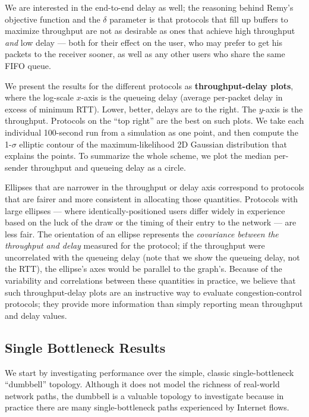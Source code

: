 We are interested in the end-to-end delay as well; the reasoning
behind Remy's objective function and the $\delta$ parameter is that
protocols that fill up buffers to maximize throughput are not as
desirable as ones that achieve high throughput \emph{and} low delay
--- both for their effect on the user, who may prefer to get his
packets to the receiver sooner, as well as any other users who share
the same FIFO queue.

We present the results for the different protocols as {\bf
  throughput-delay plots}, where the log-scale $x$-axis is the
queueing delay (average per-packet delay in excess of minimum
RTT). Lower, better, delays are to the right.  The $y$-axis is the
throughput. Protocols on the ``top right'' are the best on such
plots. We take each individual 100-second run from a simulation as one
point, and then compute the 1-$\sigma$ elliptic contour
of the maximum-likelihood 2D Gaussian distribution that explains the
points. To summarize the whole scheme, we plot the median per-sender
throughput and queueing delay as a circle.

Ellipses that are narrower in the throughput or delay axis correspond
to protocols that are fairer and more consistent in allocating those
quantities. Protocols with large ellipses --- where
identically-positioned users differ widely in experience based on the
luck of the draw or the timing of their entry to the network --- are
less fair. The orientation of an ellipse represents the {\em
  covariance between the throughput and delay} measured for the
protocol; if the throughput were uncorrelated with the queueing delay
(note that we show the queueing delay, not the RTT), the ellipse's
axes would be parallel to the graph's.
Because of the variability and correlations between these quantities
in practice, we believe that such throughput-delay plots are an
instructive way to evaluate congestion-control protocols; they provide
more information than simply reporting mean throughput and delay values.

\subsection{Single Bottleneck Results}

We start by investigating performance over the simple, classic
single-bottleneck ``dumbbell'' topology.  Although it does not model
the richness of real-world network paths, the dumbbell is a valuable
topology to investigate because in practice there are many
single-bottleneck paths experienced by Internet flows.

